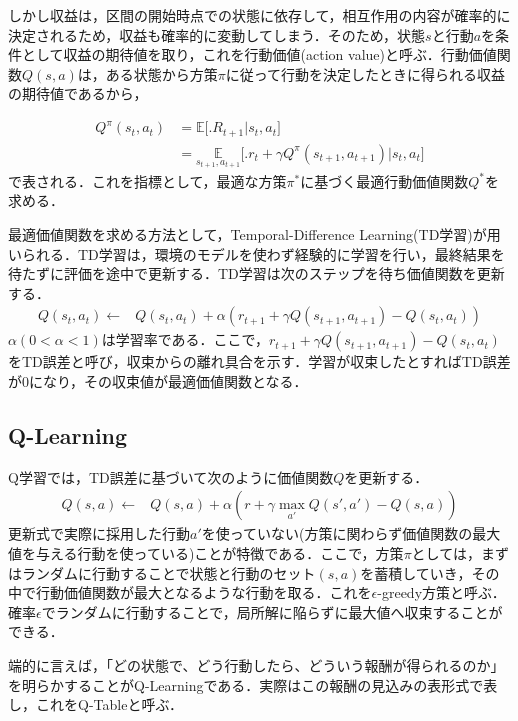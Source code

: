 しかし収益は，区間の開始時点での状態に依存して，相互作用の内容が確率的に決定されるため，収益も確率的に変動してしまう．そのため，状態$s$と行動$a$を条件として収益の期待値を取り，これを行動価値(action value)と呼ぶ．行動価値関数$Q(s,a)$は，ある状態から方策$\pi$に従って行動を決定したときに得られる収益の期待値であるから，

\begin{align}\label{eq:Qfunction}
  Q^{\pi}(s_t, a_t) & = \mathbb{E}\bigl[ \bigl. R_{t+1} \bigr| s_t, a_t\bigr] \\
    & = \underset{s_{t+1}, a_{t+1} }{\mathbb{E}}\bigl[ \bigl. r_t + \gamma Q^{\pi}(s_{t+1}, a_{t+1}) \bigr| s_t, a_t \bigr]
\end{align}
で表される．これを指標として，最適な方策$\pi ^*$に基づく最適行動価値関数$Q^*$を求める．

最適価値関数を求める方法として，Temporal-Difference Learning(TD学習)が用いられる．TD学習は，環境のモデルを使わず経験的に学習を行い，最終結果を待たずに評価を途中で更新する．TD学習は次のステップを待ち価値関数を更新する．
\begin{align}\label{eq:TD}
Q(s_t, a_t) \leftarrow & Q(s_t, a_t) + \alpha (r_{t+1} + \gamma Q(s_{t+1}, a_{t+1}) - Q(s_t, a_t) )
\end{align}
$\alpha(0<\alpha<1)$は学習率である．ここで，$r_{t+1} + \gamma Q(s_{t+1}, a_{t+1}) - Q(s_t, a_t)$をTD誤差と呼び，収束からの離れ具合を示す．学習が収束したとすればTD誤差が0になり，その収束値が最適価値関数となる．

\subsection{Q-Learning\cite{QLearning}}
Q学習では，TD誤差に基づいて次のように価値関数$Q$を更新する．
\begin{align}\label{eq:Qupdate}
    Q(s,a) \leftarrow & Q(s,a) + \alpha (r + \gamma\underset{a'}{\max}{Q(s',a')} - Q(s,a))
\end{align}
更新式で実際に採用した行動$a'$を使っていない(方策に関わらず価値関数の最大値を与える行動を使っている)ことが特徴である．ここで，方策$\pi$としては，まずはランダムに行動することで状態と行動のセット$(s,a)$を蓄積していき，その中で行動価値関数が最大となるような行動を取る．これを$\epsilon$-greedy方策と呼ぶ．確率$\epsilon$でランダムに行動することで，局所解に陥らずに最大値へ収束することができる．

端的に言えば，「どの状態で、どう行動したら、どういう報酬が得られるのか」を明らかすることがQ-Learningである．実際はこの報酬の見込みの表形式で表し，これをQ-Tableと呼ぶ．

